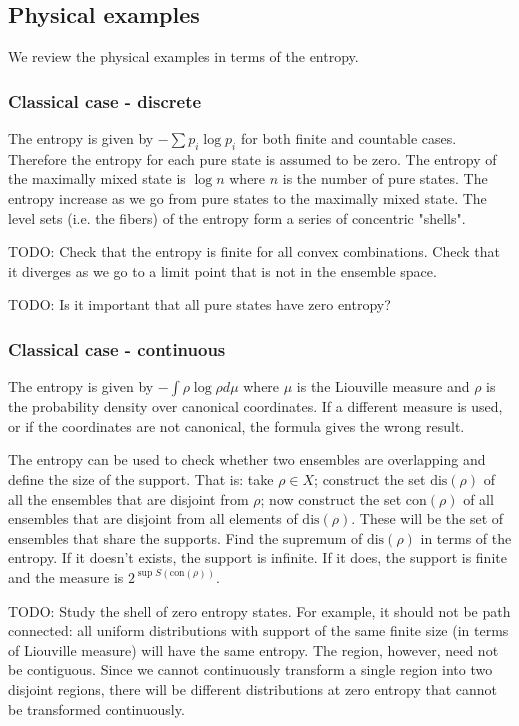 \documentclass[11pt]{article}
\begin{document}
\subsection{Physical examples}

We review the physical examples in terms of the entropy.

\subsubsection{Classical case - discrete}

The entropy is given by $-\sum p_i \log p_i$ for both finite and countable cases. Therefore the entropy for each pure state is assumed to be zero. The entropy of the maximally mixed state is $\log n$ where $n$ is the number of pure states. The entropy increase as we go from pure states to the maximally mixed state. The level sets (i.e. the fibers) of the entropy form a series of concentric "shells".

TODO: Check that the entropy is finite for all convex combinations. Check that it diverges as we go to a limit point that is not in the ensemble space.

TODO: Is it important that all pure states have zero entropy?

\subsubsection{Classical case - continuous}

The entropy is given by $- \int \rho \log \rho d\mu$ where $\mu$ is the Liouville measure and $\rho$ is the probability density over canonical coordinates. If a different measure is used, or if the coordinates are not canonical, the formula gives the wrong result.

The entropy can be used to check whether two ensembles are overlapping and define the size of the support. That is: take $\rho \in X$; construct the set $\text{dis}(\rho)$ of all the ensembles that are disjoint from $\rho$; now construct the set $\text{con}(\rho)$ of all ensembles that are disjoint from all elements of $\text{dis}(\rho)$. These will be the set of ensembles that share the supports. Find the supremum of $\text{dis}(\rho)$ in terms of the entropy. If it doesn't exists, the support is infinite. If it does, the support is finite and the measure is $2^{\sup S(\text{con}(\rho))}$.

TODO: Study the shell of zero entropy states. For example, it should not be path connected: all uniform distributions with support of the same finite size (in terms of Liouville measure) will have the same entropy. The region, however, need not be contiguous. Since we cannot continuously transform a single region into two disjoint regions, there will be different distributions at zero entropy that cannot be transformed continuously.
\end{document}
